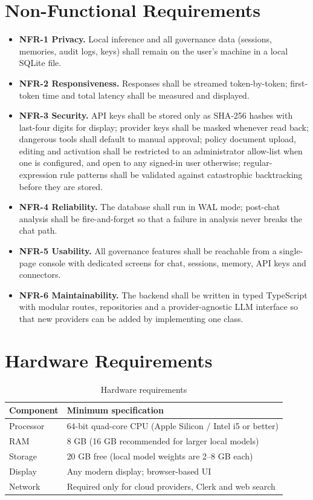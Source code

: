 \documentclass[12pt,a4paper,oneside]{report}
\begin{document}
\section{Non-Functional Requirements}
\begin{itemize}
  \item \textbf{NFR-1 Privacy.} Local inference and all governance
        data (sessions, memories, audit logs, keys) shall remain on
        the user's machine in a local SQLite file.
  \item \textbf{NFR-2 Responsiveness.} Responses shall be streamed
        token-by-token; first-token time and total latency shall be
        measured and displayed.
  \item \textbf{NFR-3 Security.} API keys shall be stored only as
        SHA-256 hashes with last-four digits for display; provider
        keys shall be masked whenever read back; dangerous tools shall
        default to manual approval; policy document upload, editing
        and activation shall be restricted to an administrator
        allow-list when one is configured, and open to any signed-in
        user otherwise; regular-expression rule patterns shall be
        validated against catastrophic backtracking before they are
        stored.
  \item \textbf{NFR-4 Reliability.} The database shall run in WAL mode;
        post-chat analysis shall be fire-and-forget so that a failure
        in analysis never breaks the chat path.
  \item \textbf{NFR-5 Usability.} All governance features shall be
        reachable from a single-page console with dedicated screens
        for chat, sessions, memory, API keys and connectors.
  \item \textbf{NFR-6 Maintainability.} The backend shall be written
        in typed TypeScript with modular routes, repositories and a
        provider-agnostic LLM interface so that new providers can be
        added by implementing one class.
\end{itemize}

\section{Hardware Requirements}
\begin{table}[h]
\caption{Hardware requirements}
\centering
\begin{tabular}{p{4.5cm}p{8.5cm}}
\toprule
\textbf{Component} & \textbf{Minimum specification} \\
\midrule
Processor & 64-bit quad-core CPU (Apple Silicon / Intel i5 or better) \\
RAM & 8 GB (16 GB recommended for larger local models) \\
Storage & 20 GB free (local model weights are 2--8 GB each) \\
Display & Any modern display; browser-based UI \\
Network & Required only for cloud providers, Clerk and web search \\
\bottomrule
\end{tabular}
\end{table}
\end{document}
